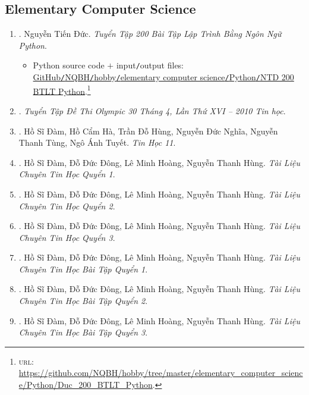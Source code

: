 \documentclass{article}
\begin{document}
\subsection{Elementary Computer Science}

\begin{enumerate}
	\item \cite{Duc_200_BT_Python}. Nguyễn Tiến Đức. \textit{Tuyển Tập 200 Bài Tập Lập Trình Bằng Ngôn Ngữ Python}.\hfill{\sf[reading]}
	\begin{itemize}
		\item Python source code $+$ input{\tt/}output files:\\\href{https://github.com/NQBH/hobby/tree/master/elementary_computer_science/Python/Duc_200_BTLT_Python}{GitHub{\tt/}NQBH{\tt/}hobby{\tt/}elementary computer science{\tt/}Python{\tt/}NTD 200 BTLT Python}.\footnote{\textsc{url}: \url{https://github.com/NQBH/hobby/tree/master/elementary_computer_science/Python/Duc_200_BTLT_Python}.}
	\end{itemize}
	\item \cite{Olympic30-4_2010_Tin_Hoc}. \textit{Tuyển Tập Đề Thi Olympic 30 Tháng 4, Lần Thứ XVI -- 2010 Tin học}.\hfill{\sf[reading]}
	\item \cite{SGK_Tin_Hoc_11}. Hồ Sĩ Đàm, Hồ Cẩm Hà, Trần Đỗ Hùng, Nguyễn Đức Nghĩa, Nguyễn Thanh Tùng, Ngô Ánh Tuyết. \textit{Tin Học 11}.\\\mbox{}\hfill{\sf[done]}
	\item \cite{TL_chuyen_Tin_quyen_1}. Hồ Sĩ Đàm, Đỗ Đức Đông, Lê Minh Hoàng, Nguyễn Thanh Hùng. \textit{Tài Liệu Chuyên Tin Học Quyển 1}.\hfill{\sf[reading]}
	\item \cite{TL_chuyen_Tin_quyen_2}. Hồ Sĩ Đàm, Đỗ Đức Đông, Lê Minh Hoàng, Nguyễn Thanh Hùng. \textit{Tài Liệu Chuyên Tin Học Quyển 2}.\hfill{\sf[reading]}
	\item \cite{TL_chuyen_Tin_quyen_3}. Hồ Sĩ Đàm, Đỗ Đức Đông, Lê Minh Hoàng, Nguyễn Thanh Hùng. \textit{Tài Liệu Chuyên Tin Học Quyển 3}.\hfill{\sf[reading]}
	\item \cite{TL_chuyen_Tin_BT_quyen_1}. Hồ Sĩ Đàm, Đỗ Đức Đông, Lê Minh Hoàng, Nguyễn Thanh Hùng. \textit{Tài Liệu Chuyên Tin Học Bài Tập Quyển 1}.\\\mbox{}\hfill{\sf[reading]}
	\item \cite{TL_chuyen_Tin_BT_quyen_2}. Hồ Sĩ Đàm, Đỗ Đức Đông, Lê Minh Hoàng, Nguyễn Thanh Hùng. \textit{Tài Liệu Chuyên Tin Học Bài Tập Quyển 2}.\\\mbox{}\hfill{\sf[reading]}
	\item \cite{TL_chuyen_Tin_BT_quyen_3}. Hồ Sĩ Đàm, Đỗ Đức Đông, Lê Minh Hoàng, Nguyễn Thanh Hùng. \textit{Tài Liệu Chuyên Tin Học Bài Tập Quyển 3}.\\\mbox{}\hfill{\sf[reading]}

\end{enumerate}
\end{document}
